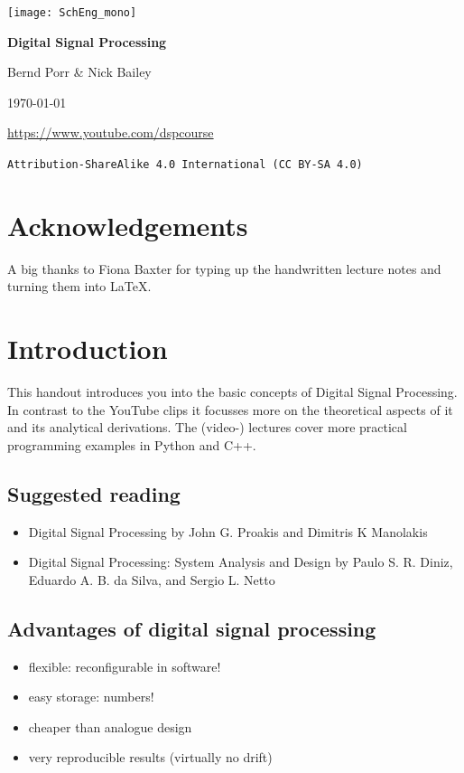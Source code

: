 \documentclass[12pt,a4paper]{article}
\begin{document}
\begin{center}
\mbox{\texttt{[image: SchEng\_mono]}}

\vfill

{\bf \Huge Digital Signal Processing}

\bigskip

{\Large Bernd Porr \& Nick Bailey}

\bigskip

{\small \today}

\vfill

\url{https://www.youtube.com/dspcourse}

\bigskip

\noindent\texttt{Attribution-ShareAlike 4.0 International (CC BY-SA 4.0)}

\vfill


\end{center}

\clearpage

\tableofcontents

\clearpage

\section{Acknowledgements}
A big thanks to Fiona Baxter for typing up the handwritten lecture notes and turning
them into \LaTeX.

\section{Introduction}
This handout introduces you into the basic concepts of Digital Signal Processing.
In contrast to the YouTube clips it focusses more on the theoretical
aspects of it and its analytical derivations. The (video-) lectures
cover more practical programming examples in Python and C++.

\subsection{Suggested reading}
\begin{itemize}
\item Digital Signal Processing
by John G. Proakis and Dimitris K Manolakis
\item Digital Signal Processing: System Analysis and Design by Paulo S. R. Diniz, Eduardo A. B. da Silva, and Sergio L. Netto 
\end{itemize}

\subsection{Advantages of digital signal processing}
\begin{itemize}
\item flexible: reconfigurable in software!
\item easy storage: numbers!
\item cheaper than analogue design
\item very reproducible results (virtually no drift)
\end{itemize}
\end{document}
